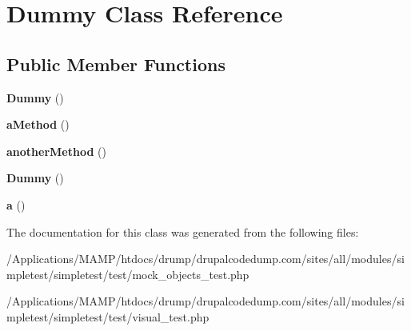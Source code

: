 \hypertarget{class_dummy}{
\section{Dummy Class Reference}
\label{class_dummy}
}
\subsection*{Public Member Functions}
\begin{DoxyCompactItemize}
\item 
\hypertarget{class_dummy_afe03b8568b4af57481b092f8356ca041}{
{\bfseries Dummy} ()}
\label{class_dummy_afe03b8568b4af57481b092f8356ca041}

\item 
\hypertarget{class_dummy_ae6a1c73a190ac0877d39e5e51a8e8df8}{
{\bfseries aMethod} ()}
\label{class_dummy_ae6a1c73a190ac0877d39e5e51a8e8df8}

\item 
\hypertarget{class_dummy_af16cb67a60e09bc17e42be14f0419cd4}{
{\bfseries anotherMethod} ()}
\label{class_dummy_af16cb67a60e09bc17e42be14f0419cd4}

\item 
\hypertarget{class_dummy_afe03b8568b4af57481b092f8356ca041}{
{\bfseries Dummy} ()}
\label{class_dummy_afe03b8568b4af57481b092f8356ca041}

\item 
\hypertarget{class_dummy_a059d91c36863661567d8753cabaabadf}{
{\bfseries a} ()}
\label{class_dummy_a059d91c36863661567d8753cabaabadf}

\end{DoxyCompactItemize}


The documentation for this class was generated from the following files:\begin{DoxyCompactItemize}
\item 
/Applications/MAMP/htdocs/drump/drupalcodedump.com/sites/all/modules/simpletest/simpletest/test/mock\_\-objects\_\-test.php\item 
/Applications/MAMP/htdocs/drump/drupalcodedump.com/sites/all/modules/simpletest/simpletest/test/visual\_\-test.php\end{DoxyCompactItemize}

